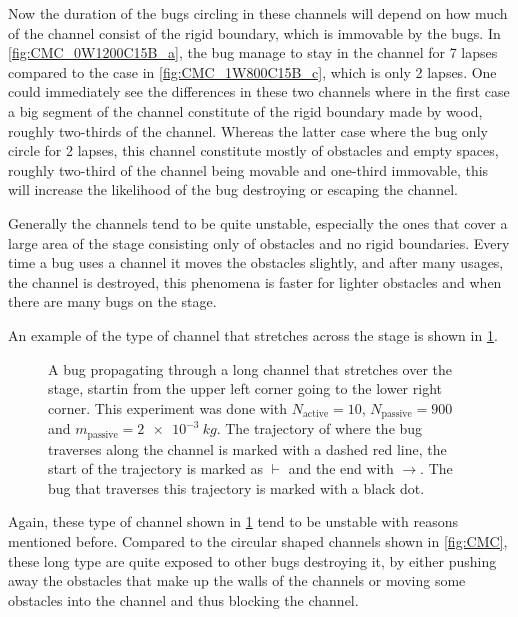 Now the duration of the bugs circling in these channels will depend on how much of the channel 
consist of the rigid boundary, which is immovable by the bugs. In \cref{fig:CMC_0W1200C15B_a}, the bug manage to stay in 
the channel for 7 lapses compared to the case in \cref{fig:CMC_1W800C15B_c}, which is only 2 lapses. 
One could immediately see the differences in these two channels where in the first case a big segment 
of the channel constitute of the rigid boundary made by wood, roughly two-thirds of the channel. Whereas the latter 
case where the bug only circle for 2 lapses, this channel constitute mostly of obstacles and empty spaces, 
roughly two-third of the channel being movable and one-third immovable, this will increase the likelihood 
of the bug destroying or escaping the channel. 

Generally the channels tend to be quite unstable, especially the ones that cover a large area of 
the stage consisting only of obstacles and no rigid boundaries. Every time a bug uses a channel it moves 
the obstacles slightly, and after many usages, the channel is destroyed, this phenomena is faster for 
lighter obstacles and when there are many bugs on the stage.

An example of the type of channel that stretches across the stage is shown in \cref{fig:CM_0W900C10B}.

\begin{figure}[htpb!]
\centering
{}
\caption{A bug propagating through a long channel that stretches over the stage, 
startin from the upper left corner going to the lower right corner.
This experiment was done with $N_{\text{active}}=10$, $N_{\text{passive}}=900$ and 
$m_{\text{passive}}=\SI{2e-3}{kg}$. The trajectory of where the bug traverses along the 
channel is marked with a dashed red line, the start of the trajectory is marked as $\vdash$ and the 
end with $\rightarrow$. The bug that traverses this trajectory is marked with a black dot.} 
\label{fig:CM_0W900C10B}
\end{figure}

Again, these type of channel shown in \cref{fig:CM_0W900C10B} tend to be unstable with 
reasons mentioned before. Compared to the circular shaped channels shown in \cref{fig:CMC}, these long type 
are quite exposed to other bugs destroying it, by either pushing away the obstacles that make up the walls of the channels 
or moving some obstacles into the channel and thus blocking the channel. 

